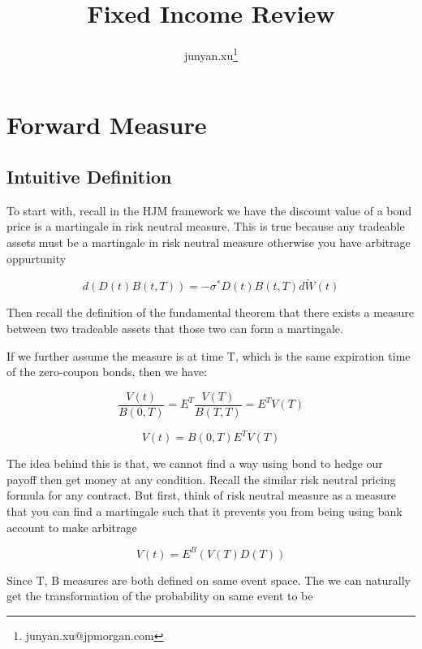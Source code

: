 \documentclass[11pt, oneside]{article}   	%
\title{Fixed Income Review}
\author{junyan.xu\footnote{junyan.xu@jpmorgan.com}}
\begin{document}
\maketitle
\tableofcontents
\newpage

\section{Forward Measure}

\subsection{Intuitive Definition}

To start with, recall in the HJM framework we have the discount value of a bond price is a martingale in risk neutral measure. This is true
because any tradeable assets must be a martingale in risk neutral measure otherwise you have arbitrage oppurtunity

\begin{equation}
  d(D(t)B(t, T)) = -\sigma^{\ast}D(t)B(t, T)d\widetilde{W}(t)
\end{equation}

Then recall the definition of the fundamental theorem that there exists a measure between two tradeable assets that those two can form a martingale.

If we further assume the measure is at time T, which is the same expiration time of the zero-coupon bonds, then we have:

\begin{equation}
  \frac{V(t)}{B(0, T)} = E^{T}\frac{V(T)}{B(T, T)} = E^{T}V(T)
\end{equation}

\begin{equation}
  V(t) = B(0, T)E^{T}V(T)
\end{equation}

The idea behind this is that, we cannot find a way using bond to hedge our payoff then get money at any condition. Recall the similar risk neutral
pricing formula for any contract. But first, think of risk neutral measure as a measure that you can find a martingale such that it prevents you from being using
bank account to make arbitrage

\begin{equation}
  V(t) = E^{B}(V(T)D(T))
\end{equation}


Since T, B measures are both defined on same event space. The we can naturally get the transformation of the probability on same event to be
\end{document}
